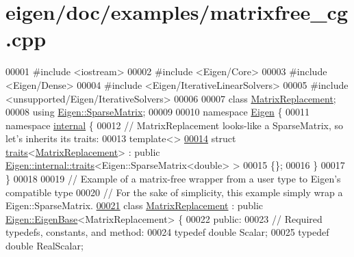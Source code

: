 \hypertarget{eigen_2doc_2examples_2matrixfree__cg_8cpp_source}{}\section{eigen/doc/examples/matrixfree\+\_\+cg.cpp}
\label{eigen_2doc_2examples_2matrixfree__cg_8cpp_source}

\begin{DoxyCode}
00001 \textcolor{preprocessor}{#include <iostream>}
00002 \textcolor{preprocessor}{#include <Eigen/Core>}
00003 \textcolor{preprocessor}{#include <Eigen/Dense>}
00004 \textcolor{preprocessor}{#include <Eigen/IterativeLinearSolvers>}
00005 \textcolor{preprocessor}{#include <unsupported/Eigen/IterativeSolvers>}
00006 
00007 \textcolor{keyword}{class }\hyperlink{class_matrix_replacement}{MatrixReplacement};
00008 \textcolor{keyword}{using} \hyperlink{group___sparse_core___module_class_eigen_1_1_sparse_matrix}{Eigen::SparseMatrix};
00009 
00010 \textcolor{keyword}{namespace }\hyperlink{namespace_eigen}{Eigen} \{
00011 \textcolor{keyword}{namespace }\hyperlink{namespaceinternal}{internal} \{
00012   \textcolor{comment}{// MatrixReplacement looks-like a SparseMatrix, so let's inherits its traits:}
00013   \textcolor{keyword}{template}<>
\hyperlink{struct_eigen_1_1internal_1_1traits_3_01_matrix_replacement_01_4}{00014}   \textcolor{keyword}{struct }\hyperlink{struct_eigen_1_1internal_1_1traits}{traits}<\hyperlink{class_matrix_replacement}{MatrixReplacement}> :  \textcolor{keyword}{public} 
      \hyperlink{struct_eigen_1_1internal_1_1traits}{Eigen::internal::traits}<Eigen::SparseMatrix<double> >
00015   \{\};
00016 \}
00017 \}
00018 
00019 \textcolor{comment}{// Example of a matrix-free wrapper from a user type to Eigen's compatible type}
00020 \textcolor{comment}{// For the sake of simplicity, this example simply wrap a Eigen::SparseMatrix.}
\hyperlink{class_matrix_replacement}{00021} \textcolor{keyword}{class }\hyperlink{class_matrix_replacement}{MatrixReplacement} : \textcolor{keyword}{public} \hyperlink{group___core___module_struct_eigen_1_1_eigen_base}{Eigen::EigenBase}<MatrixReplacement> \{
00022 \textcolor{keyword}{public}:
00023   \textcolor{comment}{// Required typedefs, constants, and method:}
00024   \textcolor{keyword}{typedef} \textcolor{keywordtype}{double} Scalar;
00025   \textcolor{keyword}{typedef} \textcolor{keywordtype}{double} RealScalar;

\end{DoxyCode}
